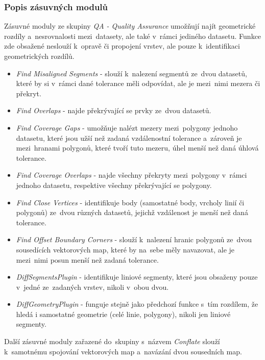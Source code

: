 \subsubsection{Popis zásuvných modulů}

Zásuvné moduly ze skupiny \textit{QA - Quality Assurance} umožňují najít geometrické rozdíly a~nesrovnalosti mezi~datasety, ale také v~rámci jediného datasetu. Funkce zde
obsažené neslouží k~opravě či propojení vrstev, ale pouze k~identifikaci geometrických rozdílů.

\begin{itemize}
 \item \textit{Find Misaligned Segments} - slouží k~nalezení segmentů ze~dvou datasetů, které by si v~rámci dané tolerance měli odpovídat, ale je mezi~nimi mezera či překryt. 
 \item \textit{Find Overlaps} - najde překrývající se prvky ze~dvou datasetů.
 \item \textit{Find Coverage Gaps} - umožňuje nalézt mezery mezi~polygony jednoho datasetu, které jsou užší než zadaná vzdálenostní tolerance a~zároveň je mezi~hranami polygonů,
	které tvoří tuto mezeru, úhel menší než daná úhlová tolerance.
 \item \textit{Find Coverage Overlaps} - najde všechny překryty mezi~polygony v~rámci jednoho datasetu, respektive všechny překrývající se polygony.
 \item \textit{Find Close Vertices} - identifikuje body (samostatné body, vrcholy linií či polygonů) ze~dvou různých datasetů, jejichž vzdálenost je menší než daná tolerance.
 \item \textit{Find Offset Boundary Corners} - slouží k~nalezení hranic polygonů ze~dvou sousedících vektorových map, které by na~sebe měly navazovat, ale je mezi~nimi posun
	menší než zadaná tolerance.
 \item \textit{DiffSegmentsPlugin} - identifikuje liniové segmenty, které jsou obsaženy pouze v~jedné ze~zadaných vrstev, nikoli v~obou dvou.
 \item \textit{DiffGeometryPlugin} - funguje stejně jako předchozí funkce s~tím rozdílem, že hledá i samostatné geometrie (celé linie, polygony), nikoli jen liniové segmenty.
\end{itemize}

Další zásuvné moduly zařazené do~skupiny s~názvem \textit{Conflate} slouží k~samotnému spojování vektorových map a~navázání dvou sousedních map.

